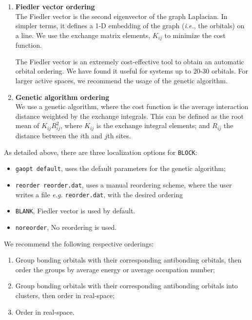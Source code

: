 \documentclass[letterpaper,12pt,aps, pra]{revtex4-1}
\begin{document}
\begin{enumerate}
	\item \textbf{Fiedler vector ordering}\\
The Fiedler vector is the second eigenvector of the graph Laplacian. In
simpler terms, it defines a 1-D embedding of the graph (\textit{i.e.}, the
orbitals) on a line. We use the exchange matrix elements, $K_{ij}$ to minimize
the cost function.

The Fiedler vector is an extremely cost-effective tool to obtain an automatic
orbital ordering. We have found it useful for systems up to 20-30 orbitals.
For larger active spaces, we recommend the usage of the genetic algorithm.

\item \textbf{Genetic algorithm ordering} \\
We use a genetic algorithm, where the cost function is the average interaction
distance weighted by the exchange integrals. This can be defined as the root
mean of $K_{ij}R_{ij}^{2}$, where $K_{ij}$ is the exchange integral elements;
and $R_{ij}$ the distance between the $i$th and $j$th sites.
\end{enumerate}

As detailed above, there are three localization options for \texttt{BLOCK}:

\begin{itemize}
	\item \texttt{gaopt default}, uses the default parameters for the genetic
		algorithm;
	\item \texttt{reorder reorder.dat}, uses a manual reordering scheme,
		where the user writes a file \textit{e.g.} \texttt{reorder.dat}, 
		with the desired ordering
	\item \texttt{BLANK}, Fiedler vector is used by default.
	 \item \texttt{noreorder}, No reordering is used.

\end{itemize}

We recommend the following respective orderings:
\begin{enumerate}
\item Group bonding orbitals with their corresponding antibonding orbitals, then order the groups by average energy or average occupation number;
\item Group bonding orbitals with their corresponding antibonding orbitals into clusters, then order in real-space;
\item Order in real-space.
\end{enumerate}
\end{document}
